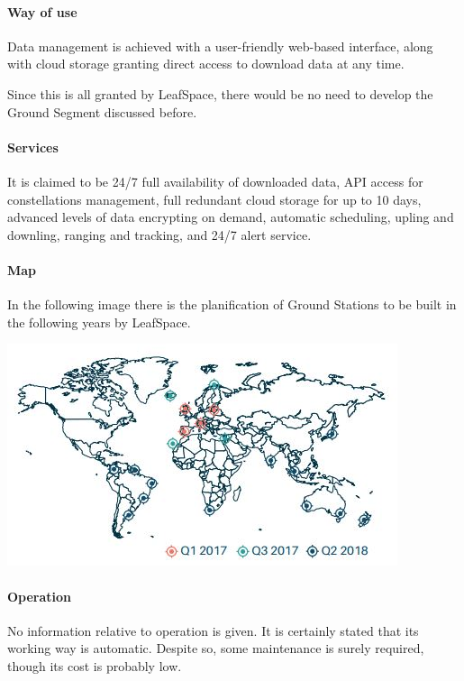 \paragraph{Way of use}
Data management is achieved with a user-friendly web-based interface, along with cloud storage granting direct access to download data at any time. 

Since this is all granted by LeafSpace, there would be no need to develop the Ground Segment discussed before. 

\paragraph{Services}
It is claimed to be 24/7 full availability of downloaded data, API access for constellations management, full redundant cloud storage for up to 10 days, advanced levels of data encrypting on demand, automatic scheduling, upling and downling, ranging and tracking, and 24/7 alert service. 

\paragraph{Map}
In the following image there is the planification of Ground Stations to be built in the following years by LeafSpace. 

\includegraphics{LeafSpace.jpg}

\paragraph{Operation}
No information relative to operation is given. It is certainly stated that its working way is automatic. Despite so, some maintenance is surely required, though its cost is probably low.


